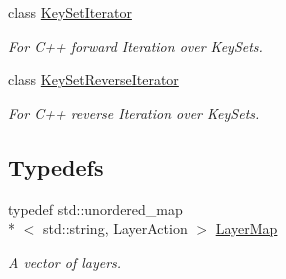 \begin{DoxyCompactItemize}
class \hyperlink{classkdb_1_1KeySetIterator}{Key\-Set\-Iterator}
\begin{DoxyCompactList}\small\item\em For C++ forward Iteration over Key\-Sets. \end{DoxyCompactList}\item 
class \hyperlink{classkdb_1_1KeySetReverseIterator}{Key\-Set\-Reverse\-Iterator}
\begin{DoxyCompactList}\small\item\em For C++ reverse Iteration over Key\-Sets. \end{DoxyCompactList}\end{DoxyCompactItemize}
\subsection*{Typedefs}
\begin{DoxyCompactItemize}
\item 
\hypertarget{namespacekdb_ac389d72a0c7be0c026628870f81148fe}{typedef std\-::unordered\-\_\-map\\*
$<$ std\-::string, Layer\-Action $>$ \hyperlink{namespacekdb_ac389d72a0c7be0c026628870f81148fe}{Layer\-Map}}\label{namespacekdb_ac389d72a0c7be0c026628870f81148fe}

\begin{DoxyCompactList}\small\item\em A vector of layers. \end{DoxyCompactList}\end{DoxyCompactItemize}
